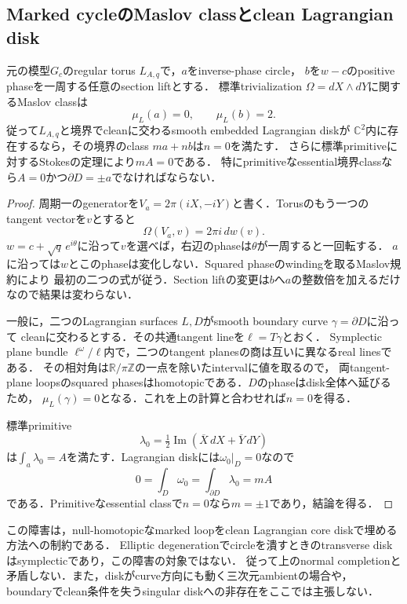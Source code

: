 \subsection{Marked cycleのMaslov classとclean Lagrangian disk}
\label{ncc:maslov-clean-disk-section}

\begin{lemma}
\label{ncc:normal-maslov-marking}
元の模型$G_c$のregular torus $L_{A,q}$で，$a$をinverse-phase circle，
$b$を$w-c$のpositive phaseを一周する任意のsection liftとする．
標準trivialization $\Omega=dX\wedge dY$に関するMaslov classは
\[
 \mu_L(a)=0,\qquad \mu_L(b)=2.
\]
従って$L_{A,q}$と境界でcleanに交わるsmooth embedded Lagrangian diskが
$\mathbb C^2$内に存在するなら，その境界のclass $ma+nb$は$n=0$を満たす．
さらに標準primitiveに対するStokesの定理により$mA=0$である．
特にprimitiveなessential境界classなら$A=0$かつ$\partial D=\pm a$でなければならない．
\end{lemma}

\begin{proof}
周期一のgeneratorを$V_a=2\pi(iX,-iY)$と書く．Torusのもう一つのtangent vectorを$v$とすると
\[
 \Omega(V_a,v)=2\pi i\,dw(v).
\]
$w=c+\sqrt q\,e^{i\theta}$に沿って$v$を選べば，右辺のphaseは$\theta$が一周すると一回転する．
$a$に沿っては$w$とこのphaseは変化しない．Squared phaseのwindingを取るMaslov規約により
最初の二つの式が従う．Section liftの変更は$b$へ$a$の整数倍を加えるだけなので結果は変わらない．

一般に，二つのLagrangian surfaces $L,D$がsmooth boundary curve $\gamma=\partial D$に沿って
cleanに交わるとする．その共通tangent lineを$\ell=T\gamma$とおく．
Symplectic plane bundle $\ell^\omega/\ell$内で，二つのtangent planesの商は互いに異なるreal linesである．
その相対角は$\mathbb R/\pi\mathbb Z$の一点を除いたintervalに値を取るので，
両tangent-plane loopsのsquared phasesはhomotopicである．$D$のphaseはdisk全体へ延びるため，
$\mu_L(\gamma)=0$となる．これを上の計算と合わせれば$n=0$を得る．

標準primitive
\[
 \lambda_0=\tfrac12\operatorname{Im}(\overline X\,dX+\overline Y\,dY)
\]
は$\int_a\lambda_0=A$を満たす．Lagrangian diskには$\omega_0|_D=0$なので
\[
 0=\int_D\omega_0=\int_{\partial D}\lambda_0=mA
\]
である．Primitiveなessential classで$n=0$なら$m=\pm1$であり，結論を得る．
\end{proof}

\begin{remark}
この障害は，null-homotopicなmarked loopをclean Lagrangian core diskで埋める方法への制約である．
Elliptic degenerationでcircleを潰すときのtransverse diskはsymplecticであり，この障害の対象ではない．
従って上のnormal completionと矛盾しない．また，diskがcurve方向にも動く三次元ambientの場合や，
boundaryでclean条件を失うsingular diskへの非存在をここでは主張しない．
\end{remark}
